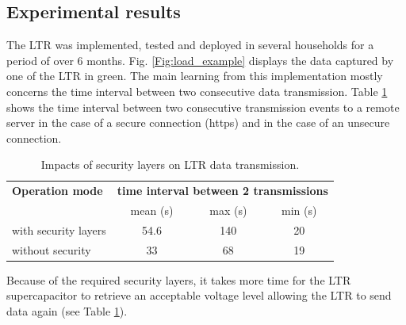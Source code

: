 \documentclass[conference]{IEEEtran}
\begin{document}
\subsection{Experimental results}
The LTR was implemented, tested and deployed in several households for a period of over 6 months. Fig. \ref{Fig:load_example} displays the data captured by one of the LTR in green. The main learning from this implementation mostly concerns the time interval between two consecutive data transmission. Table \ref{Table:securityimpact} shows the time interval between two consecutive transmission events to a remote server in the case of a secure connection (https) and in the case of an unsecure connection.


%
\begin{table}[h]
	\caption{Impacts of security layers on LTR data transmission.} %
\label{Table:securityimpact}
\small %
\centering %
\begin{tabular}{lccc} %
	\toprule[\heavyrulewidth]\toprule[\heavyrulewidth]
	\textbf{Operation mode} &  \multicolumn{3}{c}{ \textbf{time interval between 2 transmissions }} \\
	
	\textbf{} &  mean (s) &  max (s) &  min (s)\\		
	\midrule
	with security layers & 54.6 & 140 & 20 \\ 
	without security  & 33 & 68 & 19 \\ 
	\bottomrule[\heavyrulewidth] 
\end{tabular}
\end{table}
%

Because of the required security layers, %
it takes more time for the LTR supercapacitor to retrieve an acceptable voltage level allowing the LTR to send data again (see Table \ref{Table:securityimpact}).
\end{document}
